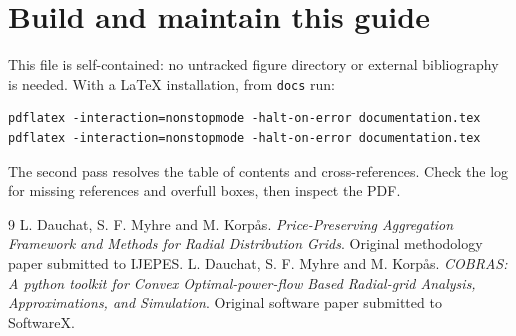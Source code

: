\documentclass[11pt,a4paper]{article}
\newcommand{\code}[1]{\nolinkurl{#1}}
\begin{document}
\section{Build and maintain this guide}
This file is self-contained: no untracked figure directory or external
bibliography is needed. With a LaTeX installation, from \code{docs} run:
\begin{lstlisting}
pdflatex -interaction=nonstopmode -halt-on-error documentation.tex
pdflatex -interaction=nonstopmode -halt-on-error documentation.tex
\end{lstlisting}
The second pass resolves the table of contents and cross-references. Check the
log for missing references and overfull boxes, then inspect the PDF. 

{\small
\begin{thebibliography}{9}
 L. Dauchat, S. F. Myhre and M. Korp\aa s.
\emph{Price-Preserving Aggregation Framework and Methods for Radial Distribution Grids}.
Original methodology paper submitted to IJEPES.
 L. Dauchat, S. F. Myhre and M. Korp\aa s.
\emph{COBRAS: A python toolkit for Convex Optimal-power-flow Based Radial-grid
Analysis, Approximations, and Simulation}.
Original software paper submitted to SoftwareX.
\end{thebibliography}
}
\end{document}
